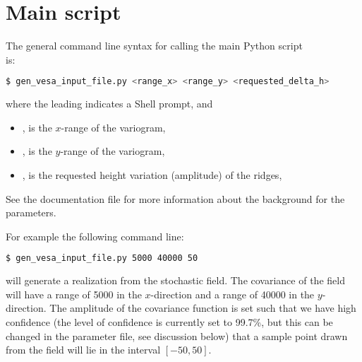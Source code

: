 \documentclass[11pt,a4paper]{amsart}
\begin{document}
\section{Main script}
The general command line syntax for calling the main Python script\\
\mainScriptKJ{} is:
\begin{lstlisting}[language=bash,basicstyle=\scriptsize]
$ gen_vesa_input_file.py <range_x> <range_y> <requested_delta_h>
\end{lstlisting}
where the leading \hltexttt{\$} indicates a Shell prompt, and
\begin{itemize}
\item \rangeX{}, is the $x$-range of the variogram,
\item \rangeY{}, is the $y$-range of the variogram,
\item \paramAmp{}, is the requested height variation (amplitude) of the ridges,
\end{itemize}
See the documentation file \docSetup{} for more information about the
background for the parameters.

For example the following command line:
\begin{lstlisting}[language=bash]
$ gen_vesa_input_file.py 5000 40000 50
\end{lstlisting}
will generate a realization from the stochastic field. The covariance of
the field will have a range of 5000 in the $x$-direction and a range of 40000 in
the $y$-direction. The amplitude of the covariance function is set such that
we have high confidence (the level of confidence is currently set to 99.7\%,
but this can be changed in the parameter file, see discussion 
below) that a sample point drawn from the field will lie in the interval $[-50, 50]$.
\end{document}
